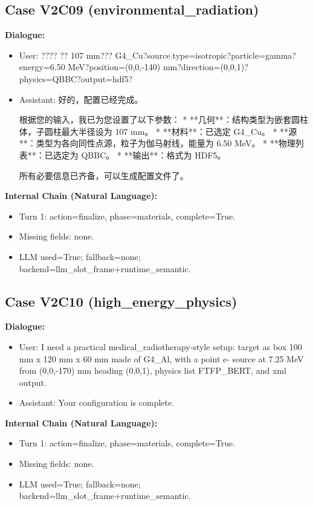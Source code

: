 \documentclass[11pt]{ctexart}
\begin{document}
\subsection{Case V2C09 (environmental\_radiation)}
\textbf{Dialogue:}
\begin{itemize}
\item User: ???? ?? 107 mm??? G4\_Cu?source.type=isotropic?particle=gamma?energy=6.50 MeV?position=(0,0,-140) mm?direction=(0,0,1)?physics=QBBC?output=hdf5?
\item Assistant: 好的，配置已经完成。

根据您的输入，我已为您设置了以下参数：
*   **几何**：结构类型为嵌套圆柱体，子圆柱最大半径设为 107 mm。
*   **材料**：已选定 G4\_Cu。
*   **源**：类型为各向同性点源，粒子为伽马射线，能量为 6.50 MeV。
*   **物理列表**：已选定为 QBBC。
*   **输出**：格式为 HDF5。

所有必要信息已齐备，可以生成配置文件了。
\end{itemize}
\textbf{Internal Chain (Natural Language):}
\begin{itemize}
\item Turn 1: action=finalize, phase=materials, complete=True.
\item Missing fields: none.
\item LLM used=True; fallback=none; backend=llm\_slot\_frame+runtime\_semantic.
\end{itemize}
\subsection{Case V2C10 (high\_energy\_physics)}
\textbf{Dialogue:}
\begin{itemize}
\item User: I need a practical medical\_radiotherapy-style setup: target as box 100 mm x 120 mm x 60 mm made of G4\_Al, with a point e- source at 7.25 MeV from (0,0,-170) mm heading (0,0,1), physics list FTFP\_BERT, and xml output.
\item Assistant: Your configuration is complete.
\end{itemize}
\textbf{Internal Chain (Natural Language):}
\begin{itemize}
\item Turn 1: action=finalize, phase=materials, complete=True.
\item Missing fields: none.
\item LLM used=True; fallback=none; backend=llm\_slot\_frame+runtime\_semantic.
\end{itemize}
\end{document}
